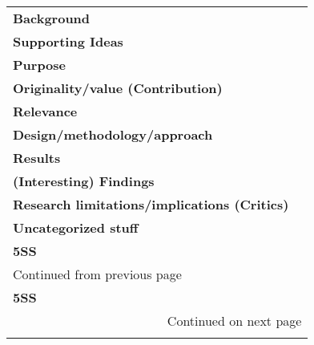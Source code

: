 \documentclass[11pt]{article}
\begin{document}
\begin{longtable}{l|p{}}
\hline
\hline
\textbf{Background} & \\
\textbf{Supporting Ideas} & \\
\textbf{Purpose} & \\
\textbf{Originality/value (Contribution)} & \\
\textbf{Relevance} & \\
\textbf{Design/methodology/approach} & \\
\textbf{Results} & \\
\textbf{(Interesting) Findings} & \\
\textbf{Research limitations/implications (Critics)} & \\
\textbf{Uncategorized stuff} & \\
\textbf{5SS} & \\
\hline
\endfirsthead
\multicolumn{2}{l}{Continued from previous page} \\

\textbf{5SS} &  \\

\hline
\endhead
\hline\multicolumn{2}{r}{Continued on next page} \\
\endfoot
\endlastfoot
\hline
\hline
\end{longtable}
\end{document}
